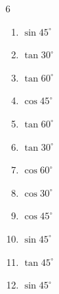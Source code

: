 \begin{multicols}{6}
\begin{enumerate}

  \item $\displaystyle \sin{45^\circ}$


  \item $\displaystyle \tan{30^\circ}$


  \item $\displaystyle \tan{60^\circ}$


  \item $\displaystyle \cos{45^\circ}$


  \item $\displaystyle \tan{60^\circ}$


  \item $\displaystyle \tan{30^\circ}$


\columnbreak %

  \item $\displaystyle \cos{60^\circ}$


  \item $\displaystyle \cos{30^\circ}$


  \item $\displaystyle \cos{45^\circ}$


  \item $\displaystyle \sin{45^\circ}$


  \item $\displaystyle \tan{45^\circ}$

        \phantom{$\displaystyle =1$}

  \item $\displaystyle \sin{45^\circ}$



\end{enumerate}
\end{multicols}
